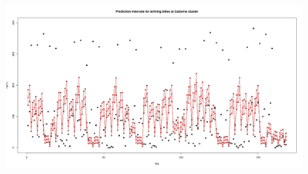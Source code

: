 \documentclass{beamer}
\begin{document}
\begin{frame}
\begin{figure}[H]
\centering
\includegraphics[width=1\linewidth]{pictures/cadorna_nin.png} 
\end{figure}
\end{frame}
\end{document}
